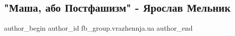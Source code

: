  
 
 
 
 

\subsection{"Маша, або Постфашизм" - Ярослав Мельник}
\label{sec:17_02_2023.fb.fb_group.vrazhennja.ua.1._masha__abo_postfash}

\ifcmt
 author_begin
   author_id fb_group.vrazhennja.ua
 author_end
\fi
